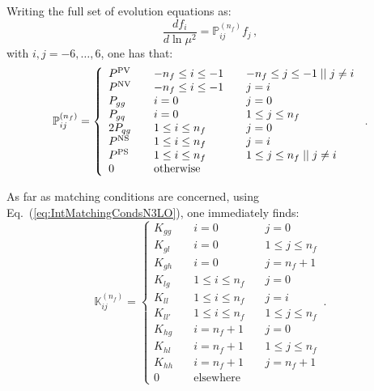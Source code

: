 \documentclass[10pt,a4paper]{article}
\begin{document}
Writing the full set of evolution equations as:
\begin{equation}
\frac{df_i}{d\ln\mu^2} = \mathbb{P}_{ij}^{(n_f)}f_j\,,
\end{equation}
with $i,j=-6,\dots,6$, one has that:
\begin{equation}
\mathbb{P}_{ij}^{(n_f)}=
\left\{
\begin{array}{lll}
P^{\rm PV} &\quad -n_f \leq i \leq -1 & \quad -n_f \leq j \leq -1\; ||\; j\neq i\\
P^{\rm NV}&\quad -n_f \leq i \leq -1 & \quad j=i\\
P_{gg} & \quad i = 0 &\quad j = 0\\
P_{gq} &\quad i = 0 & \quad 1 \leq j \leq n_f\\
2P_{qg} &\quad 1 \leq i \leq n_f & \quad j=0\\
P^{\rm NS}&\quad 1 \leq i \leq n_f & \quad j=i\\
P^{\rm PS} &\quad 1 \leq i \leq n_f & \quad 1 \leq j \leq n_f\; || \; j\neq i\\
0             & \quad\mbox{otherwise}
\end{array}
\right.\,.
\label{eq:splittingalgPhys}
\end{equation}

As far as matching conditions are concerned, using
Eq.~(\ref{eq:IntMatchingCondsN3LO}), one immediately finds:
\begin{equation}
\mathbb{K}^{(n_f)}_{ij} =
\left\{
\begin{array}{lll}
K_{gg} & \quad i = 0 &\quad j = 0\\
K_{gl} &\quad i = 0 & \quad 1 \leq j \leq n_f\\
K_{gh} &\quad i = 0 & \quad j = n_f + 1\\
K_{lg} &\quad 1 \leq i \leq n_f & \quad j=0\\
K_{ll}&\quad 1 \leq i \leq n_f & \quad j=i\\
K_{ll'} &\quad 1 \leq i \leq n_f & \quad 1 \leq j \leq n_f\\
K_{hg} &\quad i = n_f+1 & \quad j=0\\
K_{hl} &\quad i = n_f+1 & \quad 1\leq j\leq n_f\\
K_{hh} &\quad i = n_f+1 & \quad j=n_f+1\\
0             & \quad\mbox{elsewhere}
\end{array}
\right.\,.
\label{eq:algorithmPhys}
\end{equation}
\end{document}
